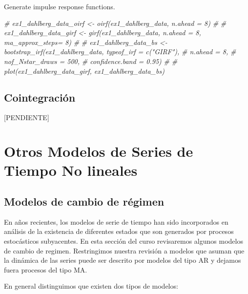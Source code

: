 \documentclass[
]{book}
\newenvironment{Shaded}{\begin{snugshade}}{\end{snugshade}}
\newcommand{\CommentTok}[1]{\textcolor[rgb]{0.56,0.35,0.01}{\textit{#1}}}
\begin{document}
Generate impulse response functions.

\begin{Shaded}
\begin{Highlighting}[]
\CommentTok{\# ex1\_dahlberg\_data\_oirf \textless{}{-}  oirf(ex1\_dahlberg\_data, n.ahead = 8)}
\CommentTok{\# }
\CommentTok{\# ex1\_dahlberg\_data\_girf \textless{}{-}  girf(ex1\_dahlberg\_data, n.ahead = 8, ma\_approx\_steps= 8)}
\CommentTok{\# }
\CommentTok{\# ex1\_dahlberg\_data\_bs \textless{}{-}  bootstrap\_irf(ex1\_dahlberg\_data, typeof\_irf = c("GIRF"),}
\CommentTok{\#                                        n.ahead = 8,}
\CommentTok{\#                                        nof\_Nstar\_draws = 500,}
\CommentTok{\#                                        confidence.band = 0.95)}
\CommentTok{\# }
\CommentTok{\# plot(ex1\_dahlberg\_data\_girf, ex1\_dahlberg\_data\_bs)}
\end{Highlighting}
\end{Shaded}

\hypertarget{cointegraciuxf3n-1}{%
\section{Cointegración}\label{cointegraciuxf3n-1}}

{[}PENDIENTE{]}

\hypertarget{otros-modelos-de-series-de-tiempo-no-lineales}{%
\chapter{Otros Modelos de Series de Tiempo No lineales}\label{otros-modelos-de-series-de-tiempo-no-lineales}}

\hypertarget{modelos-de-cambio-de-ruxe9gimen}{%
\section{Modelos de cambio de régimen}\label{modelos-de-cambio-de-ruxe9gimen}}

En años recientes, los modelos de serie de tiempo han sido incorporados en análisis de la existencia de diferentes estados que son generados por procesos estocásticos subyacentes. En esta sección del curso revisaremos algunos modelos de cambio de regimen. Restringimos nuestra revisión a modelos que asuman que la dinámica de las series puede ser descrito por modelos del tipo AR y dejamos fuera procesos del tipo MA.

En general distinguimos que existen dos tipos de modelos:
\end{document}
